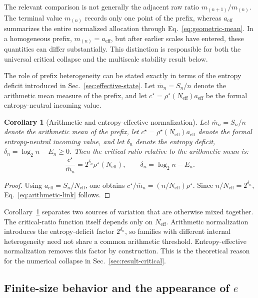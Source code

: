\documentclass[aip,cha,reprint,superscriptaddress,floatfix]{revtex4-2}
\newtheorem{corollary}[theorem]{Corollary}
\theoremstyle{definition}
\theoremstyle{remark}
\newcommand{\Neff}{N_{\mathrm{eff}}}
\newcommand{\aeff}{a_{\mathrm{eff}}}
\newcommand{\rhostar}{\rho^{\star}}
\newcommand{\cstar}{c^{\star}}
\begin{document}
The relevant comparison is not generally the adjacent raw ratio \(m_{(n+1)}/m_{(n)}\). The terminal value \(m_{(n)}\) records only one point of the prefix, whereas \(\aeff\) summarizes the entire normalized allocation through Eq.~\eqref{eq:geometric-mean}. In a homogeneous prefix, \(m_{(n)}=\aeff\), but after earlier scales have entered, these quantities can differ substantially. This distinction is responsible for both the universal critical collapse and the multiscale stability result below.

The role of prefix heterogeneity can be stated exactly in terms of the entropy deficit introduced in Sec.~\ref{sec:effective-state}. Let \(\overline m_n=S_n/n\) denote the arithmetic mean measure of the prefix, and let \(\cstar=\rhostar(\Neff)\aeff\) be the formal entropy-neutral incoming value.

\begin{corollary}[Arithmetic and entropy-effective normalization]
\label{cor:arithmetic-normalization}
Let \(\overline m_n=S_n/n\) denote the arithmetic mean of the prefix,
let \(\cstar=\rhostar(\Neff)\aeff\) denote the formal entropy-neutral
incoming value, and let \(\delta_n\) denote the entropy deficit, \(\delta_n=\log_2n-E_n\ge0\). 
Then the critical ratio relative to the arithmetic mean is:
\begin{equation}
\frac{\cstar}{\overline m_n}
=
2^{\delta_n}\rhostar(\Neff),
\qquad
\delta_n=\log_2n-E_n.
\label{eq:arithmetic-link}
\end{equation}
\end{corollary}

\begin{proof}
Using \(\aeff=S_n/\Neff\), one obtains \(\cstar/\overline m_n=(n/\Neff)\rhostar\). Since \(n/\Neff=2^{\delta_n}\), Eq.~\eqref{eq:arithmetic-link} follows.
\end{proof}

Corollary~\ref{cor:arithmetic-normalization} separates two sources of variation that are otherwise mixed together. The critical-ratio function itself depends only on \(\Neff\). Arithmetic normalization introduces the entropy-deficit factor \(2^{\delta_n}\), so families with different internal heterogeneity need not share a common arithmetic threshold. Entropy-effective normalization removes this factor by construction. This is the theoretical reason for the numerical collapse in Sec.~\ref{sec:result-critical}.

\subsection{Finite-size behavior and the appearance of \texorpdfstring{\(e\)}{e}}
\label{sec:e}
\end{document}
